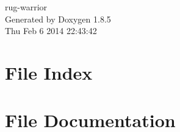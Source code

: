 \documentclass[twoside]{book}
\newcommand{\clearemptydoublepage}{%
  \newpage{\pagestyle{empty}\cleardoublepage}%
}
\begin{document}
\hypersetup{pageanchor=false}
\begin{titlepage}
\vspace*{7cm}
\begin{center}%
{\Large rug-\/warrior }\\
\vspace*{1cm}
{\large Generated by Doxygen 1.8.5}\\
\vspace*{0.5cm}
{\small Thu Feb 6 2014 22:43:42}\\
\end{center}
\end{titlepage}
\clearemptydoublepage
\tableofcontents
\clearemptydoublepage
{}
\hypersetup{pageanchor=true}

\chapter{File Index}

\chapter{File Documentation}








































\newpage
{}
{}
\printindex
\end{document}
